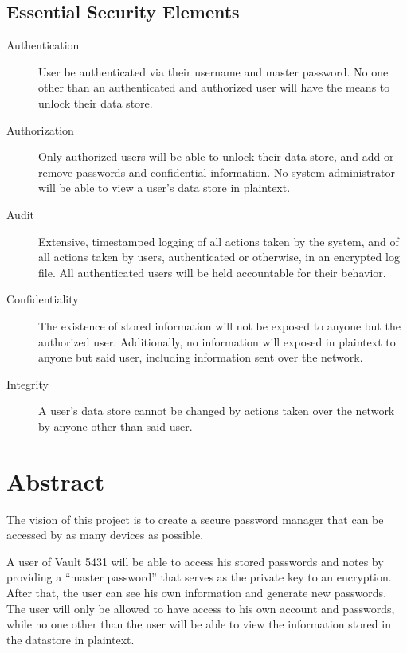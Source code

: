 \documentclass{article}
\begin{document}
\subsection{Essential Security Elements}
\label{sub:essential_security_elements}

\begin{description}
  \item[Authentication] User be authenticated via their username and master password. No one other than an authenticated and authorized user will have the means to unlock their data store.
  \item[Authorization] Only authorized users will be able to unlock their data store, and add or remove passwords and confidential information. No system administrator will be able to view a user's data store in plaintext.
  \item[Audit] Extensive, timestamped logging of all actions taken by the system, and of all actions taken by users, authenticated or otherwise, in an encrypted log file. All authenticated users will be held accountable for their behavior.
  \item[Confidentiality] The existence of stored information will not be exposed to anyone but the authorized user. Additionally, no information will exposed in plaintext to anyone but said user, including information sent over the network.
  \item[Integrity] A user's data store cannot be changed by actions taken over the network by anyone other than said user.
\end{description}

\section{Abstract}
\label{sec:abstract}

\par The vision of this project is to create a secure password manager that can be accessed by as many devices as possible.

\par A user of Vault 5431 will be able to access his stored passwords and notes by providing a “master password” that serves as the private key to an encryption. After that, the user can see his own information and generate new passwords. The user will only be allowed to have access to his own account and passwords, while no one other than the user will be able to view the information stored in the datastore in plaintext.
\end{document}
